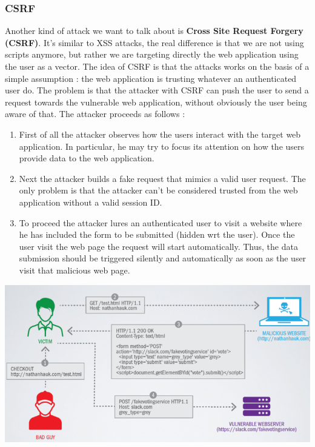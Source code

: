 \subsubsection{CSRF}
Another kind of attack we want to talk about is \textbf{Cross Site Request Forgery (CSRF)}. It's similar to XSS attacks, the real difference is that we are not using scripts anymore, but rather we are targeting directly the web application using the user as a vector. The idea of CSRF is that the attacks works on the basis of a simple assumption : the web application is trusting whatever an authenticated user do. The problem is that the attacker with CSRF can push the user to send a request towards the vulnerable web application, without obviously the user being aware of that. The attacker proceeds as follows :
\begin{enumerate}
\item First of all the attacker observes how the users interact with the target web application. In particular, he may try to focus its attention on how the users provide data to the web application.
\item Next the attacker builds a fake request that mimics a valid user request. The only problem is that the attacker can't be considered trusted from the web application without a valid session ID.
\item To proceed the attacker lures an authenticated user to visit a website where he has included the form to be submitted (hidden wrt the user). Once the user visit the web page the request will start automatically. Thus, the data submission should be triggered silently and automatically as soon as the user visit that malicious web page.
\end{enumerate}
\begin{center}
\includegraphics[scale=0.5]{./images/csrf_scenario.png}
\end{center}
